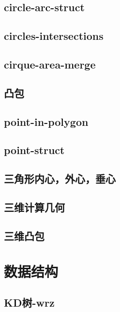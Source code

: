 \documentclass[titlepage,a4paper,10pt]{article}
\begin{document}
\begin{spacing}{0.8}
			\subsection{circle-arc-struct}
				
			\subsection{circles-intersections}
				
			\subsection{cirque-area-merge}
				
			\subsection{凸包}
				
			\subsection{point-in-polygon}
				
			\subsection{point-struct}
				
			\subsection{三角形内心，外心，垂心}
				
			\subsection{三维计算几何}
				
			\subsection{三维凸包}
				
		\section{数据结构}
			\subsection{KD树-wrz}
				

\end{spacing}
\end{document}
